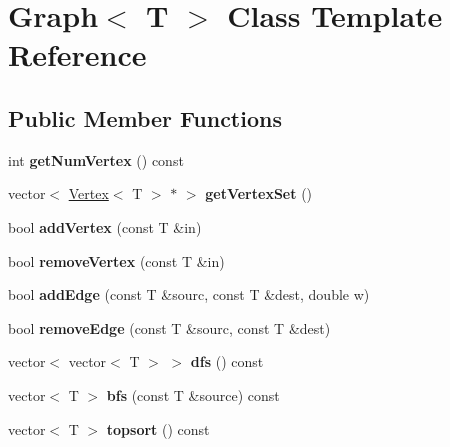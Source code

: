 \hypertarget{class_graph}{}\section{Graph$<$ T $>$ Class Template Reference}
\label{class_graph}
\subsection*{Public Member Functions}
\begin{DoxyCompactItemize}
\item 
\mbox{\label{class_graph_a0853eac15cdf0f06d63f4b8a7820ec71}} 
int {\bfseries get\+Num\+Vertex} () const
\item 
\mbox{\label{class_graph_aa81373c1c18aa90c13bea9508f766132}} 
vector$<$ \mbox{\hyperlink{class_vertex}{Vertex}}$<$ T $>$ $\ast$ $>$ {\bfseries get\+Vertex\+Set} ()
\item 
\mbox{\label{class_graph_a00be284ea2be3b3d0f0d2e493b70245b}} 
bool {\bfseries add\+Vertex} (const T \&in)
\item 
\mbox{\label{class_graph_af9c903104ad69a7782979fa9caedf163}} 
bool {\bfseries remove\+Vertex} (const T \&in)
\item 
\mbox{\label{class_graph_ac61af3aafe6277215f5a3b3cc7d58ce2}} 
bool {\bfseries add\+Edge} (const T \&sourc, const T \&dest, double w)
\item 
\mbox{\label{class_graph_a1106092a37366486cf55576f9ec01692}} 
bool {\bfseries remove\+Edge} (const T \&sourc, const T \&dest)
\item 
\mbox{\label{class_graph_a41afa32aae97b70ecaacabe5fb1a4cf0}} 
vector$<$ vector$<$ T $>$ $>$ {\bfseries dfs} () const
\item 
\mbox{\label{class_graph_aa47a4130165550e208e7a063fce6983a}} 
vector$<$ T $>$ {\bfseries bfs} (const T \&source) const
\item 
\mbox{\label{class_graph_af1d4affd1f886bf598d0f4cf4a0cb7cb}} 
vector$<$ T $>$ {\bfseries topsort} () const

\end{DoxyCompactItemize}
